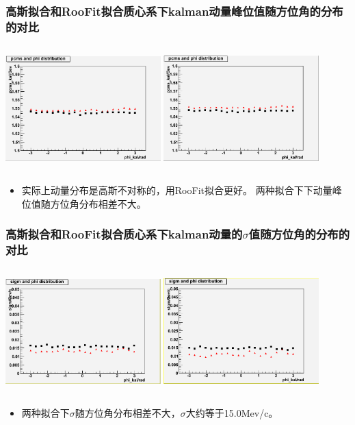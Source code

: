 \documentclass{beamer}
\begin{document}
\begin{frame}
    \frametitle{高斯拟合和RooFit拟合质心系下kalman动量峰位值随方位角的分布的对比}
    \begin{columns}
        \column{6.0cm}
        \includegraphics[width=6cm, keepaspectratio]{data/mean0.png}
        \column{6.0cm}
        \includegraphics[width=6cm, keepaspectratio]{data/mean.png}
    \end{columns}
    \begin{itemize}
        \item 实际上动量分布是高斯不对称的，用RooFit拟合更好。
            两种拟合下下动量峰位值随方位角分布相差不大。
    \end{itemize}

\end{frame}

\begin{frame}
    \frametitle{高斯拟合和RooFit拟合质心系下kalman动量的$\sigma$值随方位角的分布的对比}
    \begin{columns}
        \column{6.0cm}
        \includegraphics[width=6cm, keepaspectratio]{data/sigm0.png}
        \column{6.0cm}
        \includegraphics[width=6cm, keepaspectratio]{data/sigm.png}
    \end{columns}
    \begin{itemize}
        \item 两种拟合下$\sigma$随方位角分布相差不大，$\sigma$大约等于15.0Mev/c。
    \end{itemize}

\end{frame}
\end{document}

